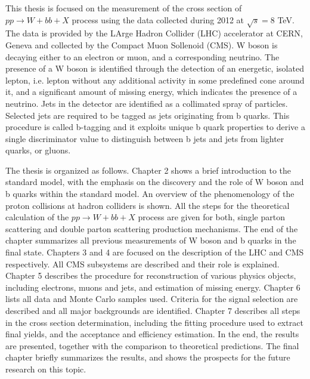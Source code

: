 \par This thesis is focused on the measurement of the cross section of $pp\rightarrow W+bb+X$ process using the data collected during 2012 at $\sqrt{s} = 8$ TeV. The data is provided by the LArge Hadron Collider (LHC) accelerator at CERN, Geneva and collected by the Compact Muon Sollenoid (CMS). W boson is decaying either to an electron or muon, and a corresponding neutrino. The presence of a W boson is identified through the detection of an energetic, isolated lepton, i.e. lepton without any additional activity in some predefined cone around it, and a significant amount of missing energy, which indicates the presence of a neutrino. Jets in the detector are identified as a collimated spray of particles. Selected jets are required to be tagged as jets originating from b quarks. This procedure is called b-tagging and it exploits unique b quark properties to derive a single discriminator value to distinguish between b jets and jets from lighter quarks, or gluons. 

The thesis is organized as follows. Chapter 2 shows a brief introduction to the standard model, with the emphasis on the discovery and the role of W boson and b quarks within the standard model. An overview of the phenomenology of the proton collisions at hadron colliders is shown. All the steps for the theoretical calculation of the $pp\rightarrow W+bb+X$ process are given for both, single parton scattering and double parton scattering production mechanisms. The end of the chapter summarizes all previous measurements of W boson and b quarks in the final state. Chapters 3 and 4 are focused on the description of the LHC and CMS respectively. All CMS subsystems are described and their role is explained. Chapter 5 describes the procedure for reconstruction of various physics objects, including electrons, muons and jets, and estimation of missing energy. Chapter 6 lists all data and Monte Carlo samples used. Criteria for the signal selection are described and all major backgrounds are identified. Chapter 7 describes all steps in the cross section determination, including the fitting procedure used to extract final yields, and the acceptance and efficiency estimation. In the end, the results are presented, together with the comparison to theoretical predictions. The final chapter briefly summarizes the results, and shows the prospects for the future research on this topic.
